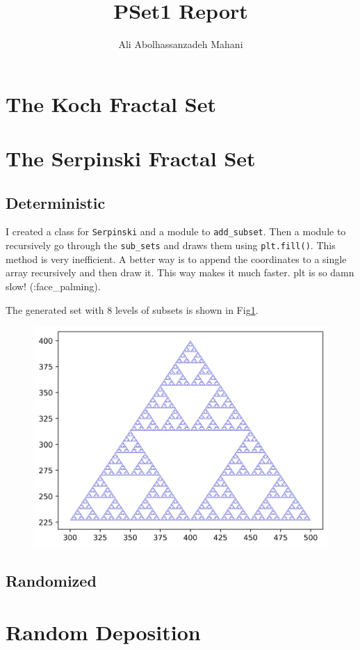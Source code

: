 \documentclass[12pt]{article}
\title{PSet1 Report}
\author{Ali Abolhassanzadeh Mahani}
\begin{document}
	\maketitle
	\section{The Koch Fractal Set}
	\section{The Serpinski Fractal Set}
		\subsection{Deterministic}
		I created a class for \texttt{Serpinski} and a module to \texttt{add\_subset}. Then a module to recursively go through the \texttt{sub\_sets} and draws them using \texttt{plt.fill()}. This method is very
		inefficient. A better way is to append the coordinates to a single array recursively and then draw it. This
		way makes it much faster. plt is so damn slow! (:face\_palming).
		
		The generated set with 8 levels of subsets is shown in Fig\ref{fig:serpDet}.
		\begin{figure}[h!]
			\includegraphics[width=.9\linewidth]{../P2/fractalstuff.jpg}
			\label{fig:serpDet}
		\end{figure}
		\subsection{Randomized}
	\section{Random Deposition}
\end{document}
